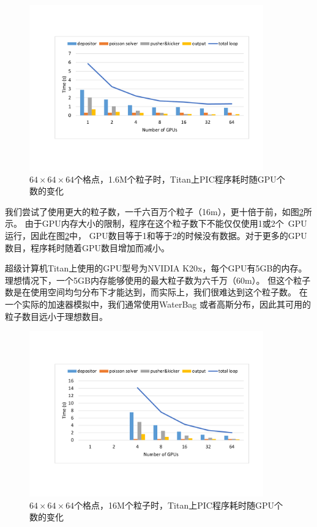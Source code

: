 \begin{figure}[!htb]
  \centering
  \includegraphics[width=0.9\textwidth]{Img/PIC_speedup_Titan_1_6m.pdf}
  \caption{$64 \times 64 \times 64$个格点，1.6M个粒子时，Titan上PIC程序耗时随GPU个数的变化}
  \label{fig:PIC_speedup_Titan_1_6m}
\end{figure}

我们尝试了使用更大的粒子数，一千六百万个粒子（16m），更十倍于前，如图\ref{fig:PIC_speedup_Titan_16m}所示。
由于GPU内存大小的限制，程序在这个粒子数下不能仅仅使用1或2个~GPU运行，因此在图\ref{fig:PIC_speedup_Titan_16m}中，
GPU数目等于1和等于2的时候没有数据。对于更多的GPU数目，程序耗时随着GPU数目增加而减小。

超级计算机Titan上使用的GPU型号为NVIDIA K20x，每个GPU有5GB的内存。
理想情况下，一个5GB内存能够使用的最大粒子数为六千万（60m）。
但这个粒子数是在使用空间均匀分布下才能达到，而实际上，我们很难达到这个粒子数。
在一个实际的加速器模拟中，我们通常使用WaterBag 或者高斯分布，因此其可用的粒子数目远小于理想数目。

\begin{figure}[!htb]
  \centering
  \includegraphics[width=0.9\textwidth]{Img/PIC_speedup_Titan_16m.pdf}
  \caption{$64 \times 64 \times 64$个格点，16M个粒子时，Titan上PIC程序耗时随GPU个数的变化}
  \label{fig:PIC_speedup_Titan_16m}
\end{figure}

